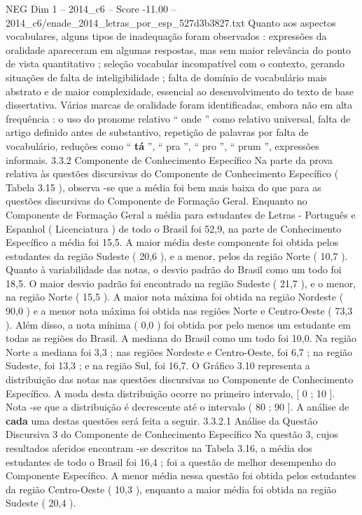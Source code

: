 \begin{textsample}{NEG Dim 1 – 2014\_c6 – Score -11.00 – 2014\_c6/enade\_2014\_letras\_por\_esp\_527d3b3827.txt}
Quanto aos aspectos vocabulares, alguns tipos de inadequação foram observados : expressões da oralidade apareceram em algumas respostas, mas sem maior relevância do ponto de vista quantitativo ; seleção vocabular incompatível com o contexto, gerando situações de falta de inteligibilidade ; falta de domínio de vocabulário mais abstrato e de maior complexidade, essencial ao desenvolvimento do texto de base dissertativa.
Várias marcas de oralidade foram identificadas, embora não em alta frequência : o uso do pronome relativo “ onde ” como relativo universal, falta de artigo definido antes de substantivo, repetição de palavras por falta de vocabulário, reduções como “ \textbf{tá} ”, “ pra ”, “ pro ”, “ prum ”, expressões informais. 3.3.2 Componente de Conhecimento Específico Na parte da prova relativa às questões discursivas do Componente de Conhecimento Específico ( Tabela 3.15 ), observa -se que a média foi bem mais baixa do que para as questões discursivas do Componente de Formação Geral.
Enquanto no Componente de Formação Geral a média para estudantes de Letras - Português e Espanhol ( Licenciatura ) de todo o Brasil foi 52,9, na parte de Conhecimento Específico a média foi 15,5.
A maior média deste componente foi obtida pelos estudantes da região Sudeste ( 20,6 ), e a menor, pelos da região Norte ( 10,7 ).
Quanto à variabilidade das notas, o desvio padrão do Brasil como um todo foi 18,5.
O maior desvio padrão foi encontrado na região Sudeste ( 21,7 ), e o menor, na região Norte ( 15,5 ).
A maior nota máxima foi obtida na região Nordeste ( 90,0 ) e a menor nota máxima foi obtida nas regiões Norte e Centro-Oeste ( 73,3 ).
Além disso, a nota mínima ( 0,0 ) foi obtida por pelo menos um estudante em todas as regiões do Brasil.
A mediana do Brasil como um todo foi 10,0.
Na região Norte a mediana foi 3,3 ; nas regiões Nordeste e Centro-Oeste, foi 6,7 ; na região Sudeste, foi 13,3 ; e na região Sul, foi 16,7.
O Gráfico 3.10 representa a distribuição das notas nas questões discursivas no Componente de Conhecimento Específico.
A moda desta distribuição ocorre no primeiro intervalo, [ 0 ; 10 ].
Nota -se que a distribuição é decrescente até o intervalo ( 80 ; 90 ].
A análise de \textbf{cada} uma destas questões será feita a seguir. 3.3.2.1 Análise da Questão Discursiva 3 do Componente de Conhecimento Específico Na questão 3, cujos resultados aferidos encontram -se descritos na Tabela 3.16, a média dos estudantes de todo o Brasil foi 16,4 ; foi a questão de melhor desempenho do Componente Específico.
A menor média nessa questão foi obtida pelos estudantes da região Centro-Oeste ( 10,3 ), enquanto a maior média foi obtida na região Sudeste ( 20,4 ).

\end{textsample}
